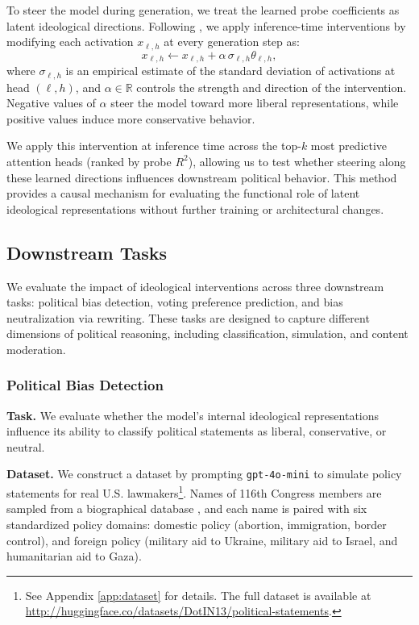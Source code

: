 \documentclass[11pt]{article}
\begin{document}
To steer the model during generation, we treat the learned probe coefficients as latent ideological directions. Following \citet{liInferenceTimeInterventionEliciting2023}, we apply inference-time interventions by modifying each activation \(x_{\ell,h}\) at every generation step as:
\[
x_{\ell,h} \leftarrow x_{\ell,h} + \alpha \, \sigma_{\ell,h} \theta_{\ell,h},
\]
where \(\sigma_{\ell,h}\) is an empirical estimate of the standard deviation of activations at head \((\ell,h)\), and \(\alpha \in \mathbb{R}\) controls the strength and direction of the intervention. Negative values of \(\alpha\) steer the model toward more liberal representations, while positive values induce more conservative behavior.

We apply this intervention at inference time across the top-\(k\) most predictive attention heads (ranked by probe \(R^2\)), allowing us to test whether steering along these learned directions influences downstream political behavior. This method provides a causal mechanism for evaluating the functional role of latent ideological representations without further training or architectural changes.

\subsection{Downstream Tasks}

We evaluate the impact of ideological interventions across three downstream tasks: political bias detection, voting preference prediction, and bias neutralization via rewriting. These tasks are designed to capture different dimensions of political reasoning, including classification, simulation, and content moderation.

\subsubsection{Political Bias Detection}

\textbf{Task.} We evaluate whether the model’s internal ideological representations influence its ability to classify political statements as liberal, conservative, or neutral.

\textbf{Dataset.} We construct a dataset by prompting \texttt{gpt-4o-mini} to simulate policy statements for real U.S. lawmakers\footnote{See Appendix \ref{app:dataset} for details. The full dataset is available at \href{http://huggingface.co/datasets/DotIN13/political-statements}{http://huggingface.co/datasets/DotIN13/political-statements}.}. Names of 116th Congress members are sampled from a biographical database \citep{kimLinearRepresentationsPolitical2025}, and each name is paired with six standardized policy domains: domestic policy (abortion, immigration, border control), and foreign policy (military aid to Ukraine, military aid to Israel, and humanitarian aid to Gaza).
\end{document}
